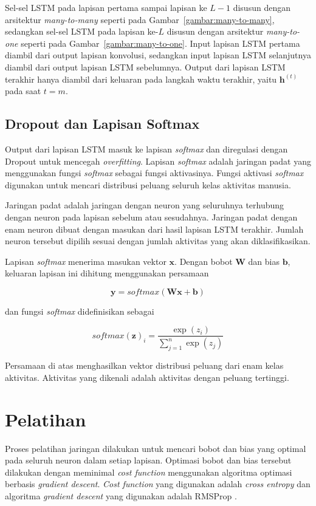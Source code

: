 Sel-sel LSTM pada lapisan pertama sampai lapisan ke $L-1$ disusun dengan arsitektur \textit{many-to-many} seperti pada Gambar~\ref{gambar:many-to-many}, sedangkan sel-sel LSTM pada lapisan ke-$L$ disusun dengan arsitektur \textit{many-to-one} seperti pada Gambar~\ref{gambar:many-to-one}. Input lapisan LSTM pertama diambil dari output lapisan konvolusi, sedangkan input lapisan LSTM selanjutnya diambil dari output lapisan LSTM sebelumnya. Output dari lapisan LSTM terakhir hanya diambil dari keluaran pada langkah waktu terakhir, yaitu $\pmb{h}^{(t)}$ pada saat $t = m$.

\subsection{Dropout dan Lapisan Softmax}
Output dari lapisan LSTM masuk ke lapisan \textit{softmax} dan diregulasi dengan Dropout untuk mencegah \textit{overfitting}. Lapisan \textit{softmax} adalah jaringan padat yang menggunakan fungsi \textit{softmax} sebagai fungsi aktivasinya. Fungsi aktivasi \textit{softmax} digunakan untuk mencari distribusi peluang seluruh kelas aktivitas manusia.

Jaringan padat adalah jaringan dengan neuron yang seluruhnya terhubung dengan neuron pada lapisan sebelum atau sesudahnya. Jaringan padat dengan enam neuron dibuat dengan masukan dari hasil lapisan LSTM terakhir. Jumlah neuron tersebut dipilih sesuai dengan jumlah aktivitas yang akan diklasifikasikan.

Lapisan \textit{softmax} menerima masukan vektor $\pmb{x}$. Dengan bobot $\pmb{W}$ dan bias $\pmb{b}$, keluaran lapisan ini dihitung menggunakan persamaan

\begin{equation}
    \pmb{y} = softmax(\pmb{W} \pmb{x} + \pmb{b})
\end{equation}

\noindent
dan fungsi \textit{softmax} didefinisikan sebagai

\begin{equation}
    softmax(\pmb{z})_i = \frac{\exp(z_i)}{\sum_{j=1}^n \exp(z_j)}
\end{equation}

Persamaan di atas menghasilkan vektor distribusi peluang dari enam kelas aktivitas. Aktivitas yang dikenali adalah aktivitas dengan peluang tertinggi.


\section{Pelatihan}
Proses pelatihan jaringan dilakukan untuk mencari bobot dan bias yang optimal pada seluruh neuron dalam setiap lapisan. Optimasi bobot dan bias tersebut dilakukan dengan meminimal \textit{cost function} menggunakan algoritma optimasi berbasis \textit{gradient descent}. \textit{Cost function} yang digunakan adalah \textit{cross entropy} dan algoritma \textit{gradient descent} yang digunakan adalah RMSProp \Parencite{Dauphin-2015}.

